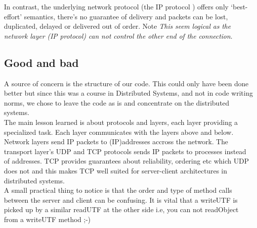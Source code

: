 In contrast, the underlying network protocol (the IP protocol ) offers only ‘best-effort’ semantics, there’s no guarantee of delivery and packets can be lost, duplicated, delayed or delivered out of order. Note \textit{This seem logical as the network layer (IP protocol) can not control the other end of the connection}. 

\pagebreak
\subsection{Good and bad}
\label{tcp_conclusion}

A source of concern is the structure of our code. This could only have been done better but since this was a course in Distributed Systems, and not in code writing norms, we chose to leave the code as is and concentrate on the distributed systems.  \\

The main lesson learned is about protocols and layers, each layer providing a specialized task. Each layer communicates with the layers above and below. Network layers send IP packets to (IP)addresses accross the network. The transport layer's UDP and TCP protocols sends IP packets to processes instead of addresses. TCP provides guarantees about reliability, ordering etc which UDP does not and this makes TCP well suited for server-client architectures in distributed systems. \\

A small practical thing to notice is that the order and type of method calls between the server and client can be confusing. It is vital that a writeUTF is picked up by a similar readUTF at the other side i.e, you can not readObject from a writeUTF method ;-) \\ 




